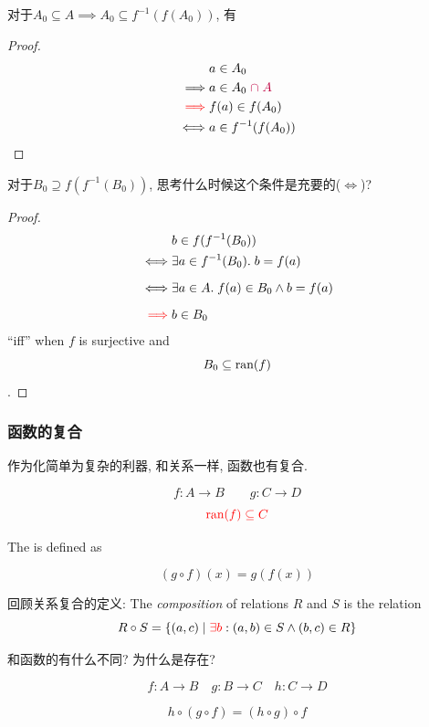 对于$A_0 \subseteq A \implies A_0 \subseteq f^{-1}(f(A_0))$, 有
\begin{proof}
  \setcounter{equation}{0}
  \begin{align*}
    &a \in A_{0} \\
    \implies & a \in A_{0} \textcolor{purple}{\;\cap\; A} \\
    \textcolor{red}{\implies} & f(a) \in f(A_{0}) \\
    \iff & a \in f^{-1}(f(A_{0}))
  \end{align*}
\end{proof}

对于$B_0 \supseteq f(f^{-1}(B_0))$, 思考什么时候这个条件是充要的($\iff$)?

\begin{proof}
  \setcounter{equation}{0}
  \begin{align*}
    &b \in f(f^{-1}(B_0)) \\
    \iff & \exists a \in f^{-1}(B_0).\; b = f(a) \\[6pt]
    \iff & \exists a \in A.\; f(a) \in B_0 \land b = f(a) \\[6pt]
    \textcolor{red}{\implies} & b \in B_0
  \end{align*}
  ``iff'' when $f$ is surjective and $$B_0 \subseteq \text{ran}(f)$$.
\end{proof}

\subsubsection{函数的复合}
作为化简单为复杂的利器, 和关系一样, 函数也有复合. 

\begin{definition}[Composition]
  \[
    f: A \to B \qquad g: C \to D
  \]
  \[
    \textcolor{red}{\text{ran}(f) \subseteq C}
  \]

  The   is defined as

  \[
    (g \circ f) (x) = g(f(x))
  \]
\end{definition}

\begin{bonus}
  回顾关系复合的定义: 
  The {\it composition} of relations $R$ and $S$ is the relation
    \[
      R \circ S = \{(a, c) \mid \textcolor{red}{\exists b}: (a, b) \in S \land (b, c) \in R\}
    \]

  和函数的有什么不同? 为什么是存在? 
\end{bonus}

\begin{theorem}
  \[
    f: A \to B \quad g: B \to C \quad h: C \to D
  \]

  \[
    h \circ (g \circ f) = (h \circ g) \circ f
  \]
\end{theorem}

